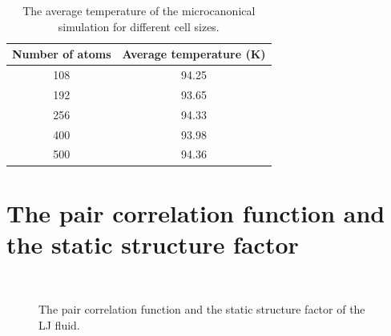 \documentclass{article}
\begin{document}
\begin{table}[!h]
    \centering
    \caption{The average temperature of the microcanonical simulation for different cell sizes.}
    \begin{tabular}{cc}
    \toprule
    Number of atoms & Average temperature (K) \\ \midrule
    108             & 94.25               \\
    192             & 93.65               \\
    256             & 94.33               \\
    400             & 93.98               \\
    500             & 94.36               \\ \bottomrule
    \end{tabular}
\end{table}

\section{The pair correlation function and the static structure factor}

\begin{figure}
    \centering
    \\
    \caption{The pair correlation function and the static structure factor of the LJ fluid.}
\end{figure}
\end{document}
